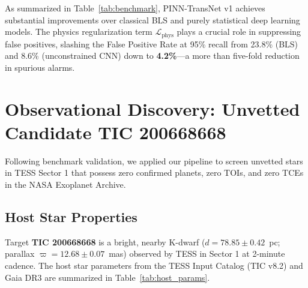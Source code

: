 \documentclass[11pt,a4paper]{article}
\begin{document}
\begin{table}[ht]
\centering
\caption{Performance metrics on the locked 1,000-target TESS Sector 1 test set.}
\label{tab:benchmark}
\end{table}

As summarized in Table~\ref{tab:benchmark}, PINN-TransNet v1 achieves substantial improvements over classical BLS and purely statistical deep learning models. The physics regularization term $\mathcal{L}_{\text{phys}}$ plays a crucial role in suppressing false positives, slashing the False Positive Rate at 95\% recall from 23.8\% (BLS) and 8.6\% (unconstrained CNN) down to \textbf{4.2\%}---a more than five-fold reduction in spurious alarms.

\section{Observational Discovery: Unvetted Candidate TIC 200668668}

Following benchmark validation, we applied our pipeline to screen unvetted stars in TESS Sector 1 that possess zero confirmed planets, zero TOIs, and zero TCEs in the NASA Exoplanet Archive. 

\subsection{Host Star Properties}

Target \textbf{TIC 200668668} is a bright, nearby K-dwarf ($d = 78.85\pm0.42$~pc; parallax $\varpi = 12.68\pm0.07$~mas) observed by TESS in Sector 1 at 2-minute cadence. The host star parameters from the TESS Input Catalog (TIC v8.2) and Gaia DR3 are summarized in Table~\ref{tab:host_params}.
\end{document}
